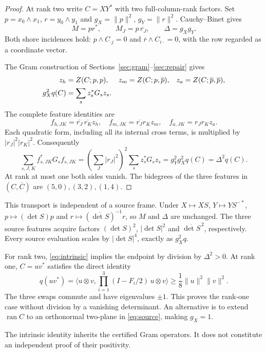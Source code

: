 \documentclass[11pt,a4paper]{article}
\theoremstyle{definition}\newtheorem{definition}[theorem]{Definition}
\theoremstyle{remark}\newtheorem{remark}[theorem]{Remark}
\DeclareMathOperator{\ran}{ran}\DeclareMathOperator{\vecop}{vec}
\newcommand{\ip}[2]{\langle#1,#2\rangle}
\numberwithin{equation}{section}
\begin{document}
\begin{proof}
At rank two write $C=XY^*$ with two full-column-rank factors.
Set $p=x_0\wedge x_1$, $r=y_0\wedge y_1$ and
$g_X=\|p\|^2$, $g_Y=\|r\|^2$.
Cauchy--Binet gives
\begin{equation}
M=pr^*,\qquad M_J=p\,\overline{r_J},\qquad
\Delta=g_Xg_Y.
\label{eq:cb}
\end{equation}
Both shore incidences hold:
$p\wedge C_{\cdot j}=0$ and $\overline r\wedge C_{i\cdot}=0$,
with the row regarded as a coordinate vector.

The Gram construction of Sections~\ref{sec:gram}--\ref{sec:repair} gives
\begin{align}
z_h&=Z(C;p,p),&z_m&=Z(C;p,\overline p),&
z_a&=Z(C;\overline p,\overline p),\notag\\
g_X^2q(C)&=\sum_s z_s^*G_sz_s.
\label{eq:source}
\end{align}
The complete feature identities are
\[
f_{h,JK}=\overline{r_J}\,\overline{r_K}z_h,\quad
f_{m,JK}=\overline{r_J}r_Kz_m,\quad
f_{a,JK}=r_Jr_Kz_a.
\]
Each quadratic form, including all its internal cross terms, is
multiplied by $|r_J|^2|r_K|^2$. Consequently
\[
\sum_{s,J,K}f_{s,JK}^*G_sf_{s,JK}
=\left(\sum_J|r_J|^2\right)^2\sum_s z_s^*G_sz_s
=g_Y^2g_X^2q(C)=\Delta^2q(C).
\]
At rank at most one both sides vanish. The bidegrees of the three
features in $(C,\overline C)$ are $(5,0),(3,2),(1,4)$.
\end{proof}

This transport is independent of a source frame.
Under $X\mapsto XS$, $Y\mapsto YS^{-*}$,
$p\mapsto(\det S)p$ and
$r\mapsto(\overline{\det S})^{-1}r$, so $M$ and $\Delta$ are unchanged.
The three source features acquire factors
$(\det S)^2$, $|\det S|^2$ and $\overline{\det S}^{\,2}$,
respectively. Every source evaluation scales by $|\det S|^4$,
exactly as $g_X^2q$.

For rank two, \eqref{eq:intrinsic} implies the endpoint by division
by $\Delta^2>0$. At rank one, $C=uv^*$ satisfies the direct identity
\begin{equation}
q(uv^*)=\ip{u\otimes v}{\prod_{i=1}^3(I-F_i/2)\,u\otimes v}
\ge\frac18\|u\|^2\|v\|^2.
\label{eq:rankone}
\end{equation}
The three swaps commute and have eigenvalues $\pm1$.
This proves the rank-one case without division by a vanishing
determinant. An alternative is to extend $\ran C$ to an orthonormal
two-plane in \eqref{eq:source}, making $g_X=1$.

The intrinsic identity inherits the certified Gram operators.
It does not constitute an independent proof of their positivity.
\end{document}

